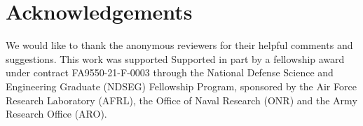\section{Acknowledgements}

We would like to thank the anonymous reviewers for their helpful comments and
suggestions. This work was supported Supported in part by a fellowship award
under contract FA9550-21-F-0003 through the National Defense Science and
Engineering Graduate (NDSEG) Fellowship Program, sponsored by the Air Force
Research Laboratory (AFRL), the Office of Naval Research (ONR) and the Army
Research Office (ARO).